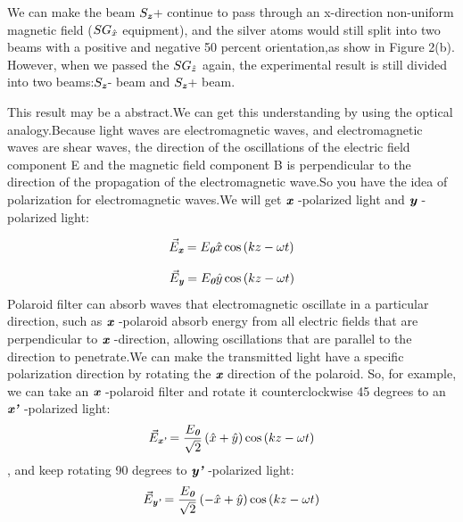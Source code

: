 \documentclass[a4paper]{article}
\def\mathbi#1{\textbf{\em #1}}
\begin{document}
We can make the beam $\textbf{$S_{\mathbi{z}}$}$+ continue to pass through an x-direction non-uniform magnetic field (\textbf{$SG_{\mathbi{$\hat{x}$}}$} equipment), and the silver atoms would still split into two beams with a positive and negative 50 percent orientation,as show in Figure 2(b).
However, when we passed the \textbf{$SG_{\mathbi{$\hat{z}$}}$} again, the experimental result is still divided into two beams:$\textbf{$S_{\mathbi{z}}$}$- beam and $\textbf{$S_{\mathbi{z}}$}$+ beam.



This result may be a abstract.We can get this understanding by using the optical analogy.Because light waves are electromagnetic waves, and electromagnetic waves are shear waves, the direction of the oscillations of the electric field component E and the magnetic field component B is perpendicular to the direction of the propagation of the electromagnetic wave.So you have the idea of polarization for electromagnetic waves.We will get  $\mathbi{x}$ -polarized light and  $\mathbi{y}$ -polarized light:

\begin{equation}
\textbf{$\vec{E}_{\mathbi{x}}$}=\textbf{$E_{\mathbi{0}}$}\hat{x}\cos{\left(kz-\omega t\right)}
\end{equation}

\begin{equation}
\textbf{$\vec{E}_{\mathbi{y}}$}=\textbf{$E_{\mathbi{0}}$}\hat{y}\cos{\left(kz-\omega t\right)}
\end{equation}
Polaroid filter can absorb waves that electromagnetic oscillate in a particular direction, such as $\mathbi{x}$ -polaroid absorb energy from all electric fields that are perpendicular to $\mathbi{x}$ -direction, allowing oscillations that are parallel to the direction to penetrate.We can make the transmitted light have a specific polarization direction by rotating the $\mathbi{x}$ direction of the polaroid.
So, for example, we can take an $\mathbi{x}$ -polaroid filter and rotate it counterclockwise 45 degrees to an $\mathbi{x'}$ -polarized light:
\begin{equation}
\textbf{$\vec{E}_{\mathbi{x'}}$}=\frac{\textbf{$E_{\mathbi{0}}$}}{\sqrt{2}}\left(\hat{x}+\hat{y}\right)\cos{\left(kz-\omega t\right)} 
\end{equation}
, and keep rotating 90 degrees to $\mathbi{y'}$ -polarized light:
\begin{equation}
\textbf{$\vec{E}_{\mathbi{y'}}$}=\frac{\textbf{$E_{\mathbi{0}}$}}{\sqrt{2}}\left(-\hat{x}+\hat{y}\right)\cos{\left(kz-\omega t\right)} 
\end{equation}
\end{document}
